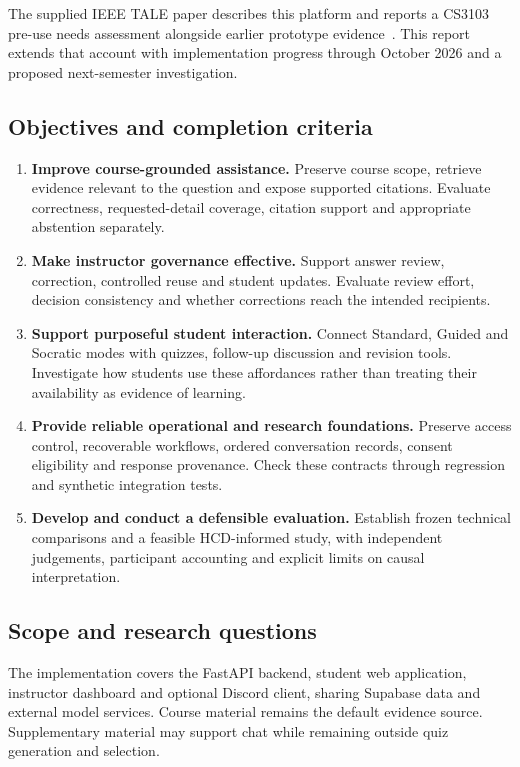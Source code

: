 \documentclass[11pt,a4paper]{article}
\begin{document}
The supplied IEEE TALE paper describes this platform and reports a CS3103 pre-use needs assessment alongside earlier prototype evidence~\cite{cragpaper}. This report extends that account with implementation progress through October 2026 and a proposed next-semester investigation.

\subsection{Objectives and completion criteria}
\begin{enumerate}[label=\textbf{O\arabic*.}]
\item \textbf{Improve course-grounded assistance.} Preserve course scope, retrieve evidence relevant to the question and expose supported citations. Evaluate correctness, requested-detail coverage, citation support and appropriate abstention separately.
\item \textbf{Make instructor governance effective.} Support answer review, correction, controlled reuse and student updates. Evaluate review effort, decision consistency and whether corrections reach the intended recipients.
\item \textbf{Support purposeful student interaction.} Connect Standard, Guided and Socratic modes with quizzes, follow-up discussion and revision tools. Investigate how students use these affordances rather than treating their availability as evidence of learning.
\item \textbf{Provide reliable operational and research foundations.} Preserve access control, recoverable workflows, ordered conversation records, consent eligibility and response provenance. Check these contracts through regression and synthetic integration tests.
\item \textbf{Develop and conduct a defensible evaluation.} Establish frozen technical comparisons and a feasible HCD-informed study, with independent judgements, participant accounting and explicit limits on causal interpretation.
\end{enumerate}

\subsection{Scope and research questions}
The implementation covers the FastAPI backend, student web application, instructor dashboard and optional Discord client, sharing Supabase data and external model services. Course material remains the default evidence source. Supplementary material may support chat while remaining outside quiz generation and selection.
\end{document}
